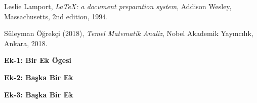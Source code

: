 \documentclass[
oneside, %
doktora, %
]{aufbetez} %
\begin{document}



\renewcommand\bibname{\centerline{KAYNAKLAR}\global\def\bibname{KAYNAKLAR}}



\begin{thebibliography}{99}
	
	Leslie Lamport,
	\textit{\LaTeX: a document preparation system},
	Addison Wesley, Massachusetts,
	2nd edition,
	1994.
	
	Süleyman Öğrekçi (2018),
	\textit{Temel Matematik Analiz},
	Nobel Akademik Yayıncılık, Ankara,
	2018.
	
\end{thebibliography}









\eklerkapagi



\textbf{Ek-1: Bir Ek Ögesi}%

\lipsum[1-3]%

\clearpage%

\textbf{Ek-2: Başka Bir Ek}

\lipsum[1-3]


\clearpage%

\textbf{Ek-3: Başka Bir Ek}

\lipsum[1-3]

\end{document}
